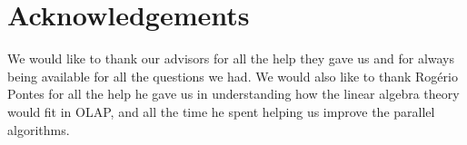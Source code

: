 \section{Acknowledgements}
\indent



We would like to thank our advisors for all the help they gave us and for always being available for all the questions
we had. 
We would also like to thank Rog\'erio Pontes for all the
help he gave us in understanding how the linear algebra theory would fit in OLAP, and all the time he spent helping us improve the parallel algorithms.
